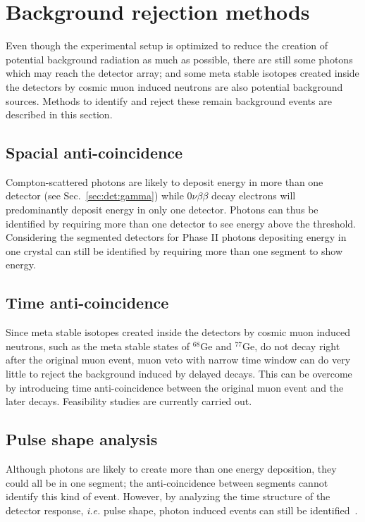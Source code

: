 \section{Background rejection methods}
\label{sec:gerda:anti}
Even though the experimental setup is optimized to reduce the creation of potential background radiation as much as possible, there are still some photons which may reach the detector array; and some meta stable isotopes created inside the detectors by cosmic muon induced neutrons are also potential background sources. Methods to identify and reject these remain background events are described in this section.

\subsection{Spacial anti-coincidence} 
\label{sec:gerda:santi}
Compton-scattered photons are likely to deposit energy in more than one detector (see Sec.~\ref{sec:det:gamma}) while $0\nu\beta\beta$ decay electrons will predominantly deposit energy in only one detector. Photons can thus be identified by requiring more than one detector to see energy above the threshold. Considering the segmented detectors for Phase II photons depositing energy in one crystal can still be identified by requiring more than one segment to show energy.~\cite{Sipid}

\subsection{Time anti-coincidence} 
\label{sec:gerda:tanti}
Since meta stable isotopes created inside the detectors by cosmic muon induced neutrons, such as the meta stable states of $^{68}$Ge and $^{77}$Ge, do not decay right after the original muon event, muon veto with narrow time window can do very little to reject the background induced by delayed decays. This can be overcome by introducing time anti-coincidence between the original muon event and the later decays. Feasibility studies are currently carried out.

\subsection{Pulse shape analysis}
\label{sec:gerda:psa}
Although photons are likely to create more than one energy deposition, they could all be in one segment; the anti-coincidence between segments cannot identify this kind of event. However, by analyzing the time structure of the detector response, \textit{i.e.} pulse shape, photon induced events can still be identified~\cite{Kev07}.

